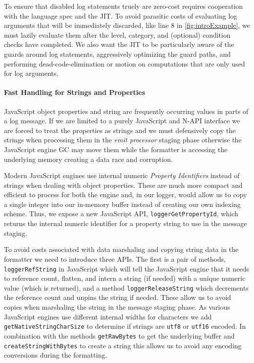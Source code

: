 To ensure that disabled log statements truely are zero-cost requires cooperation 
with the language spec and the JIT. To avoid parasitic costs of evaluating log 
arguments that will be immediately discarded, like line 8 in \autoref{fig:introExample}, 
we must lazily evaluate them after the level, category, and (optional) condition 
checks have completed. We also want the JIT to be particularly aware of the guards 
around log statements, aggressively optimizing the guard paths, and performing 
dead-code-elimination or motion on computations that are only used for log arguments.

\paragraph{Fast Handling for Strings and Properties}
\noindent
JavaScript object properties and string are frequently occurring values in 
parts of a log message. If we are limited to a purely JavaScript and N-API 
interface we are forced to treat the properties as strings and we must 
defensively copy the strings when processing them in the \emph{emit processor} staging 
phase otherwise the JavaScript engine GC may move them while the formatter is 
accessing the underlying memory creating a data race and corruption. 

Modern JavaScript engines use internal numeric \emph{Property Identifiers} 
instead of strings when dealing with object properties. These are much more 
compact and efficient to process for both the engine and, in our logger, would 
allow us to copy a single integer into our in-memory buffer instead of creating 
our own indexing scheme. Thus, we expose a new 
JavaScript API, \texttt{loggerGetPropertyId}, which returns the 
internal numeric identifier for a property string to use in the message staging. 

To avoid costs associated with data marshaling and copying string data 
in the formatter we need to introduce three APIs. The first is a pair of 
methods, \texttt{loggerRefString} in JavaScript which will tell the JavaScript 
engine that it needs to reference count, flatten, and intern a string (if needed) 
with a unique numeric value (which is returned), and a method \texttt{loggerReleaseString} 
which decrements the reference count and unpins the string if needed. These 
allow us to avoid copies when marshaling the string in the message staging 
phase. As various JavaScript engines use different internal widths for characters 
we add \texttt{getNativeStringCharSize} to determine if strings 
are \texttt{utf8} or \texttt{utf16} encoded. In combination with the methods \texttt{getRawBytes} 
to get the underlying buffer and \texttt{createStringWithBytes} to create a string this allows us to avoid any encoding 
conversions during the formatting. 

